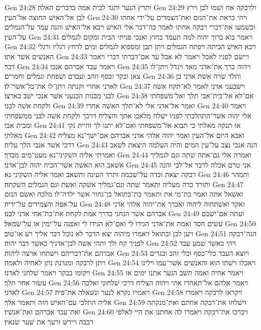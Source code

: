 Gen 24:28  ותרץ הנער ותגד לבית אמה כדברים האלה׃
Gen 24:29  ולרבקה אח ושׁמו לבן וירץ לבן אל־האישׁ החוצה אל־העין׃
Gen 24:30  ויהי כראת את־הנזם ואת־הצמדים על־ידי אחתו וכשׁמעו את־דברי רבקה אחתו לאמר כה־דבר אלי האישׁ ויבא אל־האישׁ והנה עמד על־הגמלים על־העין׃
Gen 24:31  ויאמר בוא ברוך יהוה למה תעמד בחוץ ואנכי פניתי הבית ומקום לגמלים׃
Gen 24:32  ויבא האישׁ הביתה ויפתח הגמלים ויתן תבן ומספוא לגמלים ומים לרחץ רגליו ורגלי האנשׁים אשׁר אתו׃
Gen 24:33  ויישׂם לפניו לאכל ויאמר לא אכל עד אם־דברתי דברי ויאמר דבר׃
Gen 24:34  ויאמר עבד אברהם אנכי׃
Gen 24:35  ויהוה ברך את־אדני מאד ויגדל ויתן־לו צאן ובקר וכסף וזהב ועבדם ושׁפחת וגמלים וחמרים׃
Gen 24:36  ותלד שׂרה אשׁת אדני בן לאדני אחרי זקנתה ויתן־לו את־כל־אשׁר־לו׃
Gen 24:37  וישׁבעני אדני לאמר לא־תקח אשׁה לבני מבנות הכנעני אשׁר אנכי ישׁב בארצו׃
Gen 24:38  אם־לא אל־בית־אבי תלך ואל־משׁפחתי ולקחת אשׁה לבני׃
Gen 24:39  ואמר אל־אדני אלי לא־תלך האשׁה אחרי׃
Gen 24:40  ויאמר אלי יהוה אשׁר־התהלכתי לפניו ישׁלח מלאכו אתך והצליח דרכך ולקחת אשׁה לבני ממשׁפחתי ומבית אבי׃
Gen 24:41  אז תנקה מאלתי כי תבוא אל־משׁפחתי ואם־לא יתנו לך והיית נקי מאלתי׃
Gen 24:42  ואבא היום אל־העין ואמר יהוה אלהי אדני אברהם אם־ישׁך־נא מצליח דרכי אשׁר אנכי הלך עליה׃
Gen 24:43  הנה אנכי נצב על־עין המים והיה העלמה היצאת לשׁאב ואמרתי אליה השׁקיני־נא מעט־מים מכדך׃
Gen 24:44  ואמרה אלי גם־אתה שׁתה וגם לגמליך אשׁאב הוא האשׁה אשׁר־הכיח יהוה לבן־אדני׃
Gen 24:45  אני טרם אכלה לדבר אל־לבי והנה רבקה יצאת וכדה על־שׁכמה ותרד העינה ותשׁאב ואמר אליה השׁקיני נא׃
Gen 24:46  ותמהר ותורד כדה מעליה ותאמר שׁתה וגם־גמליך אשׁקה ואשׁת וגם הגמלים השׁקתה׃
Gen 24:47  ואשׁאל אתה ואמר בת־מי את ותאמר בת־בתואל בן־נחור אשׁר ילדה־לו מלכה ואשׂם הנזם על־אפה והצמידים על־ידיה׃
Gen 24:48  ואקד ואשׁתחוה ליהוה ואברך את־יהוה אלהי אדני אברהם אשׁר הנחני בדרך אמת לקחת את־בת־אחי אדני לבנו׃
Gen 24:49  ועתה אם־ישׁכם עשׂים חסד ואמת את־אדני הגידו לי ואם־לא הגידו לי ואפנה על־ימין או על־שׂמאל׃
Gen 24:50  ויען לבן ובתואל ויאמרו מיהוה יצא הדבר לא נוכל דבר אליך רע או־טוב׃
Gen 24:51  הנה־רבקה לפניך קח ולך ותהי אשׁה לבן־אדניך כאשׁר דבר יהוה׃
Gen 24:52  ויהי כאשׁר שׁמע עבד אברהם את־דבריהם וישׁתחו ארצה ליהוה׃
Gen 24:53  ויוצא העבד כלי־כסף וכלי זהב ובגדים ויתן לרבקה ומגדנת נתן לאחיה ולאמה׃
Gen 24:54  ויאכלו וישׁתו הוא והאנשׁים אשׁר־עמו וילינו ויקומו בבקר ויאמר שׁלחני לאדני׃
Gen 24:55  ויאמר אחיה ואמה תשׁב הנער אתנו ימים או עשׂור אחר תלך׃
Gen 24:56  ויאמר אלהם אל־תאחרו אתי ויהוה הצליח דרכי שׁלחוני ואלכה לאדני׃
Gen 24:57  ויאמרו נקרא לנער ונשׁאלה את־פיה׃
Gen 24:58  ויקראו לרבקה ויאמרו אליה התלכי עם־האישׁ הזה ותאמר אלך׃
Gen 24:59  וישׁלחו את־רבקה אחתם ואת־מנקתה ואת־עבד אברהם ואת־אנשׁיו׃
Gen 24:60  ויברכו את־רבקה ויאמרו לה אחתנו את היי לאלפי רבבה ויירשׁ זרעך את שׁער שׂנאיו׃
